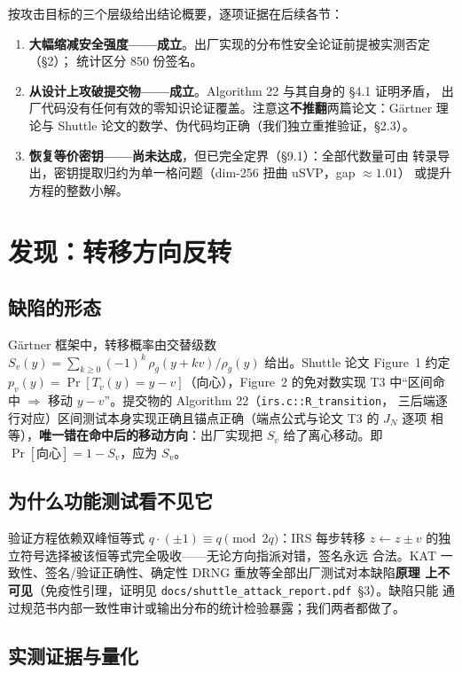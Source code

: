 \documentclass[UTF8,11pt,a4paper]{ctexart}
\newcommand{\code}[1]{\texttt{\small #1}}
\begin{document}
按攻击目标的三个层级给出结论概要，逐项证据在后续各节：
\begin{enumerate}
\item \textbf{大幅缩减安全强度——成立}。出厂实现的分布性安全论证前提被实测否定（\S2）；
  统计区分 850 份签名。
\item \textbf{从设计上攻破提交物——成立}。Algorithm 22 与其自身的 \S4.1 证明矛盾，
  出厂代码没有任何有效的零知识论证覆盖。注意这\textbf{不推翻}两篇论文：G\"artner
  理论与 Shuttle 论文的数学、伪代码均正确（我们独立重推验证，\S2.3）。
\item \textbf{恢复等价密钥——尚未达成}，但已完全定界（\S9.1）：全部代数量可由
  转录导出，密钥提取归约为单一格问题（dim-256 扭曲 uSVP，gap $\approx 1.01$）
  或提升方程的整数小解。
\end{enumerate}

\section{发现：转移方向反转}

\subsection{缺陷的形态}

G\"artner 框架中，转移概率由交替级数
$S_v(y) = \sum_{k\ge 0} (-1)^k\, \rho_g(y+kv)/\rho_g(y)$ 给出。Shuttle 论文 Figure~1
约定 $p_v(y) = \Pr[T_v(y) = y - v]$（向心），Figure~2 的免对数实现 T3 中``区间命中
$\Rightarrow$ 移动 $y - v$''。提交物的 Algorithm 22（\code{irs.c::R\_transition}，
三后端逐行对应）区间测试本身实现正确且锚点正确（端点公式与论文 T3 的 $J_N$ 逐项
相等），\textbf{唯一错在命中后的移动方向}：出厂实现把 $S_v$ 给了离心移动。即
$\Pr[\text{向心}] = 1 - S_v$，应为 $S_v$。

\subsection{为什么功能测试看不见它}

验证方程依赖双峰恒等式 $q\cdot(\pm 1) \equiv q \pmod{2q}$：IRS 每步转移
$z \leftarrow z \pm v$ 的独立符号选择被该恒等式完全吸收——无论方向指派对错，签名永远
合法。KAT 一致性、签名/验证正确性、确定性 DRNG 重放等全部出厂测试对本缺陷\textbf{原理
上不可见}（免疫性引理，证明见 \code{docs/shuttle\_attack\_report.pdf}~\S3）。缺陷只能
通过规范书内部一致性审计或输出分布的统计检验暴露；我们两者都做了。

\subsection{实测证据与量化}
\end{document}
